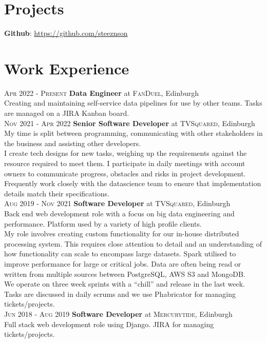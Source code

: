 \documentclass[14pt, a4paper]{extarticle}
\begin{document}
\begin{multicols}{2}
\section{Projects}
\noindent\textbf{Github}: \url{https://github.com/steeznson}

\columnbreak
\section{Work Experience}

\noindent\textsc{Apr 2022 - Present} \textbf{Data Engineer}
at \textsc{FanDuel}, Edinburgh\\
Creating and maintaining self-service data pipelines for use by other teams. Tasks are managed on a JIRA Kanban board.\\
\noindent\textsc{Nov 2021 - Apr 2022} \textbf{Senior Software Developer}
at \textsc{TVSquared}, Edinburgh\\
My time is split between programming, communicating with other stakeholders in the business and assisting other developers.\\
I create tech designs for new tasks, weighing up the requirements against the resource required to meet them. I participate in daily meetings with account owners to communicate progress, obstacles and risks in project development.\\
Frequently work closely with the datascience team to ensure that implementation details match their specifications.\\
\noindent\textsc{Aug 2019 - Nov 2021} \textbf{Software Developer}
at \textsc{TVSquared}, Edinburgh\\
Back end web development role with a focus on big data engineering and performance. Platform used by a variety of high profile clients.\\
My role involves creating custom functionality for our in-house distributed processing system. This requires close attention to detail and an understanding of how functionality can scale to encompass large datasets. Spark utilised to improve performance for large or critical jobs. Data are often being read or written from multiple sources between PostgreSQL, AWS S3 and MongoDB.\\
We operate on three week sprints with a ``chill'' and release in the last week.  Tasks are discussed in daily scrums and we use Phabricator for managing tickets/projects.\\
\noindent\textsc{Jun 2018 - Aug 2019} \textbf{Software Developer}
at \textsc{Mercurytide}, Edinburgh\\
Full stack web development role using Django. JIRA for managing tickets/projects.\\
\end{multicols}
\end{document}
